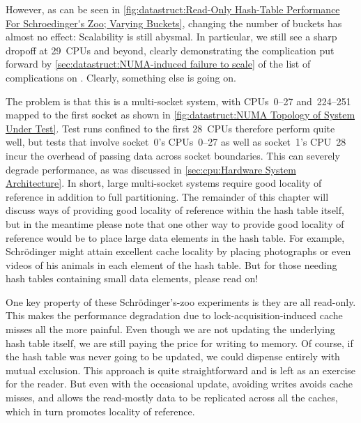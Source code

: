 However, as can be seen in
\cref{fig:datastruct:Read-Only Hash-Table Performance For Schroedinger's Zoo; Varying Buckets},
changing the number of buckets has almost no effect:
Scalability is still abysmal.
In particular, we still see a sharp dropoff at 29~CPUs and beyond,
clearly demonstrating the complication put forward by
\cref{sec:datastruct:NUMA-induced failure to scale}
of the list of complications on
.
Clearly, something else is going on.

The problem is that this is a multi-socket system, with CPUs~0--27
and~224--251 mapped to the first socket as shown in
\cref{fig:datastruct:NUMA Topology of System Under Test}.
Test runs confined to the first 28~CPUs therefore perform quite
well, but tests that involve socket~0's CPUs~0--27 as well as
socket~1's CPU~28 incur the overhead of passing data across
socket boundaries.
This can severely degrade performance, as was discussed in
\cref{sec:cpu:Hardware System Architecture}.
In short, large multi-socket systems require good locality of reference
in addition to full partitioning.
The remainder of this chapter will discuss ways of providing good
locality of reference within the hash table itself, but in the
meantime please note that one other way to provide good locality
of reference would be to place large data elements in the hash
table.
For example, Schr\"odinger might attain excellent cache locality by
placing photographs or even videos of his animals in each element of
the hash table.
But for those needing hash tables containing small data elements,
please read on!

\QuickQuizEnd

One key property of these Schr\"odinger's-zoo experiments is they are
all read-only.
This makes the performance degradation due to lock-acquisition-induced
cache misses all the more painful.
Even though we are not updating the underlying hash table itself, we are
still paying the price for writing to memory.
Of course, if the hash table was never going to be updated, we could dispense
entirely with mutual exclusion.
This approach is quite straightforward and is left as an exercise for the
reader.
But even with the occasional update, avoiding writes avoids cache
misses, and allows the read-mostly data to be replicated across all
the caches, which in turn promotes locality of reference.

